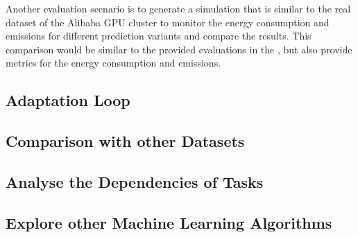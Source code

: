             Another evaluation scenario is to generate a simulation that is similar to the real dataset of the Alibaba GPU cluster to monitor the energy consumption and \COTWO emissions for different prediction variants and compare the results.
            This comparison would be similar to the provided evaluations in the , but also provide metrics for the energy consumption and \COTWO emissions.


        \subsection{Adaptation Loop}
        \label{sec:adaptation-loop-future-work}


        \subsection{Comparison with other Datasets}
        \label{sec:comparison-with-other-datasets-future-work}


        \subsection{Analyse the Dependencies of Tasks}
        \label{sec:analyse-the-dependencies-of-tasks-future-work}


        \subsection{Explore other Machine Learning Algorithms}
        \label{sec:explore-other-machine-learning-algorithms-future-work}


